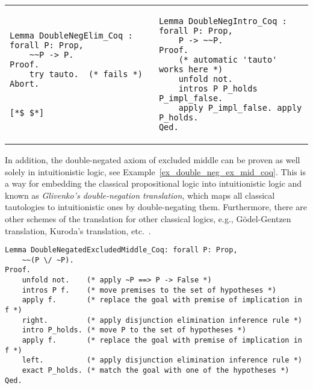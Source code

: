 \documentclass[article]{aaltoseries}
\begin{document}
\begin{raggedleft}
\begin{tabular}{p{.45\linewidth} p{.45\linewidth}}
\begin{lstlisting}[language=coq,
    caption={Proof failure of the \eqref{rule_double_negation_elim} rule in Coq},
    label=ex_double_neg_elim_coq]
Lemma DoubleNegElim_Coq : forall P: Prop,
    ~~P -> P.
Proof.
    try tauto.  (* fails *)
Abort.


[*$ $*]
\end{lstlisting} %
&
\begin{lstlisting}[language=coq,
    caption={Proof of the \eqref{rule_double_negation_elim} rule in Coq},
    label=ex_double_neg_intro_coq]
Lemma DoubleNegIntro_Coq : forall P: Prop,
    P -> ~~P.
Proof.
    (* automatic 'tauto' works here *)
    unfold not.
    intros P P_holds P_impl_false.
    apply P_impl_false. apply P_holds. 
Qed.
\end{lstlisting}
\end{tabular}
\end{raggedleft}

In addition, the double-negated axiom of excluded middle can be proven as well solely in intuitionistic logic, see Example~\ref{ex_double_neg_ex_mid_coq}. This is a way for embedding the classical propositional logic into intuitionistic logic and known as \textit{Glivenko's double-negation translation}\cite{Glivenko29}, which maps all classical tautologies to intuitionistic ones by double-negating them. Furthermore, there are other schemes of the translation for other classical logics, e.g., Gödel-Gentzen translation, Kuroda's translation, etc.~\cite{Kolmogorov25}.

\begin{lstlisting}[language=coq,
    caption={Proof of the double-negated excluded middle in Coq},
    label={ex_double_neg_ex_mid_coq}]
Lemma DoubleNegatedExcludedMiddle_Coq: forall P: Prop,
    ~~(P \/ ~P).
Proof.
    unfold not.    (* apply ~P ==> P -> False *)
    intros P f.    (* move premises to the set of hypotheses *)
    apply f.       (* replace the goal with premise of implication in f *)
    right.         (* apply disjunction elimination inference rule *)
    intro P_holds. (* move P to the set of hypotheses *)
    apply f.       (* replace the goal with premise of implication in f *)
    left.          (* apply disjunction elimination inference rule *)
    exact P_holds. (* match the goal with one of the hypotheses *)
Qed.
\end{lstlisting}
\end{document}
